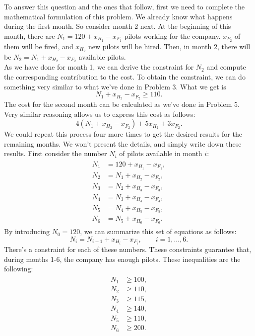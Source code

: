 \documentclass[11pt]{article}
\begin{document}
To answer this question and the ones that follow, first we need to complete the
mathematical formulation of this problem. We already know what happens during
the first month. So consider month 2 next. At the beginning of this month, there
are \(N_1=120+x_{H_1}-x_{F_1}\) pilots working for the company. \(x_{F_2}\)
of them will be fired, and \(x_{H_2}\) new pilots will be hired. Then, in
month 2, there will be \(N_2=N_1+x_{H_2}-x_{F_2}\) available pilots.\\
As we have done for month 1, we can derive the constraint for \(N_2\) and
compute the corresponding contribution to the cost. To obtain the constraint, we
can do something very similar to what we've done in Problem 3. What we get is
\begin{equation}
N_1+x_{H_2}-x_{F_2}\geq 110.
\end{equation}
The cost for the second month can be calculated as we've done in Problem 5. Very
similar reasoning allows us to express this cost as follows:
\begin{equation}
4(N_1+x_{H_2}-x_{F_2})+5x_{H_2}+3x_{F_2}.
\end{equation}
We could repeat this process four more times to get the desired results for the
remaining months. We won't present the details, and simply write down these
results. First consider the number \(N_i\) of pilots available in month \(i\):
\begin{align}
  \begin{split}
    N_1&=120+x_{H_1}-x_{F_1},\\
    N_2&=N_1+x_{H_2}-x_{F_2},\\
    N_3&=N_2+x_{H_3}-x_{F_3},\\
    N_4&=N_3+x_{H_4}-x_{F_4},\\
    N_5&=N_4+x_{H_5}-x_{F_5},\\
    N_6&=N_5+x_{H_6}-x_{F_6}.
  \end{split}
\end{align}
By introducing \(N_0=120\), we can summarize this set of equations as follows:
\begin{equation}
N_i=N_{i-1}+x_{H_i}-x_{F_i},\qquad i=1,\ldots,6.
\end{equation}
There's a constraint for each of these numbers. These constraints guarantee
that, during months 1-6, the company has enough pilots. These inequalities are
the following:
\begin{align}
  \begin{split}
    N_1&\geq 100,\\
    N_2&\geq 110,\\
    N_3&\geq 115,\\
    N_4&\geq 140,\\
    N_5&\geq 110,\\
    N_6&\geq 200.
  \end{split}
\end{align}
\end{document}
